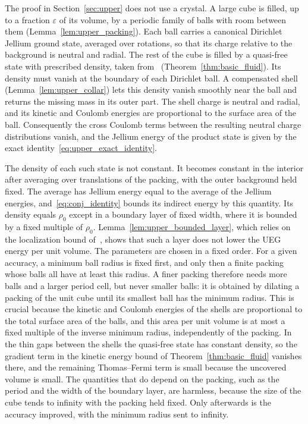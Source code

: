 \documentclass[final,reqno]{amsart}
\theoremstyle{remark}
\theoremstyle{definition}
\begin{document}
The proof in Section~\ref{sec:upper} does not use a crystal. A large cube is filled, up to a fraction $\varepsilon$ of its volume, by a periodic family of balls with room between them (Lemma~\ref{lem:upper_packing}). Each ball carries a canonical Dirichlet Jellium ground state, averaged over rotations, so that its charge relative to the background is neutral and radial. The rest of the cube is filled by a quasi-free state with prescribed density, taken from~\cite{lewin2020local} (Theorem~\ref{thm:basic_fluid}). Its density must vanish at the boundary of each Dirichlet ball. A compensated shell (Lemma~\ref{lem:upper_collar}) lets this density vanish smoothly near the ball and returns the missing mass in its outer part. The shell charge is neutral and radial, and its kinetic and Coulomb energies are proportional to the surface area of the ball. Consequently the cross Coulomb terms between the resulting neutral charge distributions vanish, and the Jellium energy of the product state is given by the exact identity~\eqref{eq:upper_exact_identity}.

The density of each such state is not constant. It becomes constant in the interior after averaging over translations of the packing, with the outer background held fixed. The average has Jellium energy equal to the average of the Jellium energies, and~\eqref{eq:conj_identity} bounds its indirect energy by this quantity. Its density equals $\rho_0$ except in a boundary layer of fixed width, where it is bounded by a fixed multiple of $\rho_0$. Lemma~\ref{lem:upper_bounded_layer}, which relies on the localization bound of~\cite{lewin2020local}, shows that such a layer does not lower the UEG energy per unit volume. The parameters are chosen in a fixed order. For a given accuracy, a minimum ball radius is fixed first, and only then a finite packing whose balls all have at least this radius. A finer packing therefore needs more balls and a larger period cell, but never smaller balls: it is obtained by dilating a packing of the unit cube until its smallest ball has the minimum radius. This is crucial because the kinetic and Coulomb energies of the shells are proportional to the total surface area of the balls, and this area per unit volume is at most a fixed multiple of the inverse minimum radius, independently of the packing. In the thin gaps between the shells the quasi-free state has constant density, so the gradient term in the kinetic energy bound of Theorem~\ref{thm:basic_fluid} vanishes there, and the remaining Thomas--Fermi term is small because the uncovered volume is small. The quantities that do depend on the packing, such as the period and the width of the boundary layer, are harmless, because the size of the cube tends to infinity with the packing held fixed. Only afterwards is the accuracy improved, with the minimum radius sent to infinity.
\end{document}
